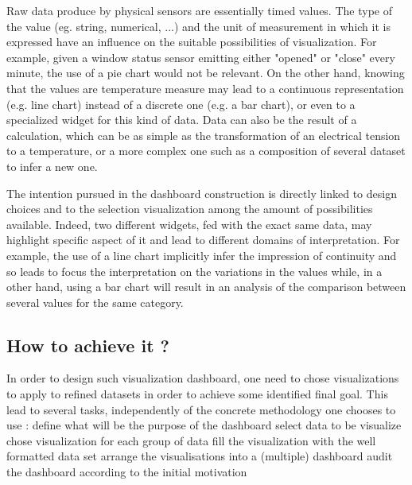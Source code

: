 \documentclass{acm_proc_article-sp}
\begin{document}
Raw data produce by physical sensors are essentially timed values. The type of
the value (eg. string, numerical, ...) and the unit of measurement in which it
is expressed have an influence on the suitable possibilities of visualization.
For example, given a window status sensor emitting either "opened" or "close"
every minute, the use of a pie chart would not be relevant. On the other hand,
knowing that the values are temperature measure may lead to a continuous representation
(e.g. line chart) instead of a discrete one (e.g. a bar chart), or even to a specialized
widget for this kind of data.
Data can also be the result of a calculation, which can be as simple as the transformation
of an electrical tension to a temperature, or a more complex one such as a composition
of several dataset to infer a new one.

The intention pursued in the dashboard construction is directly linked to design
choices and to the selection visualization among the amount of possibilities available.
Indeed, two different widgets, fed with the exact same data, may highlight specific
aspect of it and lead to different domains of interpretation. For example,
the use of a line chart implicitly infer the impression of continuity and so leads
to focus the interpretation on the variations in the values while, in a other hand,
using a bar chart will result in an analysis of the comparison between several values
for the same category.

\subsection{How to achieve it ?}
In order to design such visualization dashboard, one need to chose visualizations
to apply to refined datasets in order to achieve some identified final goal.
This lead to several tasks, independently of the concrete methodology one chooses to use :
 define what will be the purpose of the dashboard
 select data to be visualize
 chose visualization for each group of data
 fill the visualization with the well formatted data set
 arrange the visualisations into a (multiple) dashboard
 audit the dashboard according to the initial motivation
\end{document}
